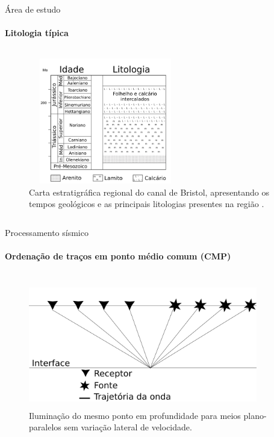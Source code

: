 \documentclass[xcolor=dvipsnames,t]{beamer}
\begin{document}
\begin{frame}{Área de estudo}
\framesubtitle{Litologia típica}	
	
\begin{columns}[onlytextwidth, T]
	\begin{column}{.90\textwidth}
		\begin{figure}[h]
			\includegraphics[width=6.7cm,height=5.5cm]{../imagens/regional.png}	
			\tiny{\caption{Carta estratigráfica regional do canal de Bristol, apresentando os tempos 				geológicos e as principais litologias presentes na região \cite{glen2005basin}.}} 	
			\label{litologia}
		\end{figure}	
	\end{column}
\end{columns}	
	
\end{frame}
\begin{frame}{Processamento sísmico}
\framesubtitle{Ordenação de traços em ponto médio comum (CMP)}	
	
\pause
\begin{columns}[onlytextwidth, T]
	\begin{column}{.90\textwidth}
		\begin{figure}[h]
			\includegraphics[width=10cm,height=5.5cm]{../imagens/cdp.png}	
			\tiny{\caption{Iluminação do mesmo ponto em profundidade para meios plano-paralelos sem variação lateral de velocidade.}} 	
			\label{cmpDomain}
		\end{figure}	
	\end{column}
\end{columns}	
	
\end{frame}
\end{document}
